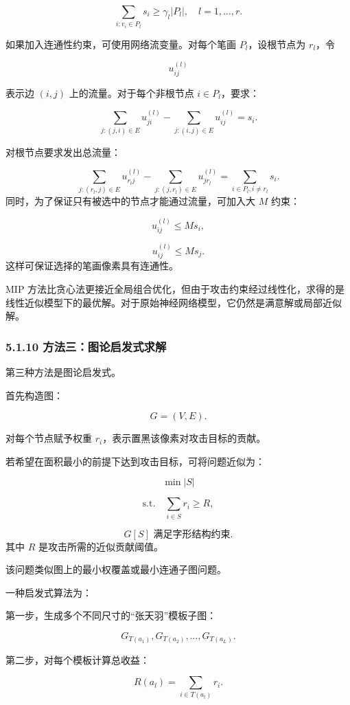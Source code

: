 ﻿\documentclass[UTF8,zihao=-4,fontset=none]{ctexart}
\begin{document}
\[
\sum_{i:v_i\in P_l}s_i
\ge
\gamma_l|P_l|,
\quad l=1,\ldots,r.
\]

如果加入连通性约束，可使用网络流变量。对每个笔画 \(P_l\)，设根节点为 \(r_l\)，令

\[
u_{ij}^{(l)}
\]

表示边 \((i,j)\) 上的流量。对于每个非根节点 \(i\in P_l\)，要求：

\[
\sum_{j:(j,i)\in E}u_{ji}^{(l)}
-
\sum_{j:(i,j)\in E}u_{ij}^{(l)}
=
s_i.
\]

对根节点要求发出总流量：

\[
\sum_{j:(r_l,j)\in E}u_{r_lj}^{(l)}
-
\sum_{j:(j,r_l)\in E}u_{jr_l}^{(l)}
=
\sum_{i\in P_l,i\ne r_l}s_i.
\]
\noindent 同时，为了保证只有被选中的节点才能通过流量，可加入大 \(M\) 约束：

\[
u_{ij}^{(l)}\le M s_i,
\]

\[
u_{ij}^{(l)}\le M s_j.
\]
\noindent 这样可保证选择的笔画像素具有连通性。

MIP 方法比贪心法更接近全局组合优化，但由于攻击约束经过线性化，求得的是线性近似模型下的最优解。对于原始神经网络模型，它仍然是满意解或局部近似解。

\subsubsection*{5.1.10 方法三：图论启发式求解}
{}

第三种方法是图论启发式。

首先构造图：

\[
G=(V,E).
\]

对每个节点赋予权重 \(r_i\)，表示置黑该像素对攻击目标的贡献。

若希望在面积最小的前提下达到攻击目标，可将问题近似为：

\[
\min |S|
\]

\[
\mathrm{s.t.}
\quad
\sum_{i\in S}r_i\ge R,
\]

\[
G[S]\text{ 满足字形结构约束}.
\]
\noindent 其中 \(R\) 是攻击所需的近似贡献阈值。

该问题类似图上的最小权覆盖或最小连通子图问题。

一种启发式算法为：

第一步，生成多个不同尺寸的“张天羽”模板子图：

\[
G_{T(a_1)},G_{T(a_2)},\ldots,G_{T(a_L)}.
\]

第二步，对每个模板计算总收益：

\[
R(a_l)=\sum_{i\in T(a_l)}r_i.
\]
\end{document}
